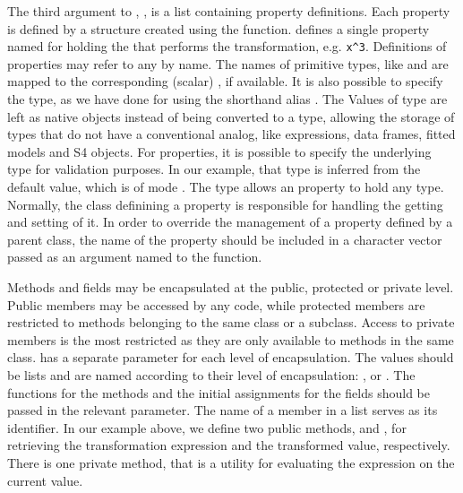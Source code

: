 \documentclass[article,shortnames]{jss}
\begin{document}
The third argument to , , is a list
containing property definitions.
Each property is defined by a  structure created
using the  function. 
defines a single property named  for holding the
  that performs the transformation, e.g.
\verb+x^3+. Definitions of properties may refer to any  by
name. The names of primitive  types, like 
and  are mapped to the corresponding (scalar)
, if available. 
It is also possible to specify the 
 type, as we have done for
 using the shorthand alias .  The
Values of type  are left
as native  objects instead of being converted to a
 type, allowing the storage of  types that do
not have a conventional  analog, like expressions, data
frames, fitted models and S4 objects. For  properties,
it is possible to specify the underlying  type for
validation purposes. In our example, that type is inferred from the
default value, which is of mode 
.  The  type
allows an  property to hold any  type.
Normally, the class definining a property is responsible for handling
the getting and setting of it. In order to override the management of
a property defined by a parent class, the name of the property should
be included in a character vector passed as an argument named
 to the  function.

Methods and fields may be encapsulated at the public, protected or
private level.  Public members may be accessed by any code, while
protected members are restricted to methods belonging to the same
class or a subclass. Access to private members is the most restricted
as they are only available to methods in the same class. 
has a separate parameter for each level of encapsulation. The
values should be lists and are named according to their level of
encapsulation:
,  or .  The functions
for the methods and the initial assignments for the fields should be
passed in the relevant parameter. The name of a member in a list
serves as its identifier. In our example above, we define two public
methods,  and , for retrieving
the transformation expression and the transformed value,
respectively. There is one private method,  that
is a utility for evaluating the expression on the current value.
\end{document}

